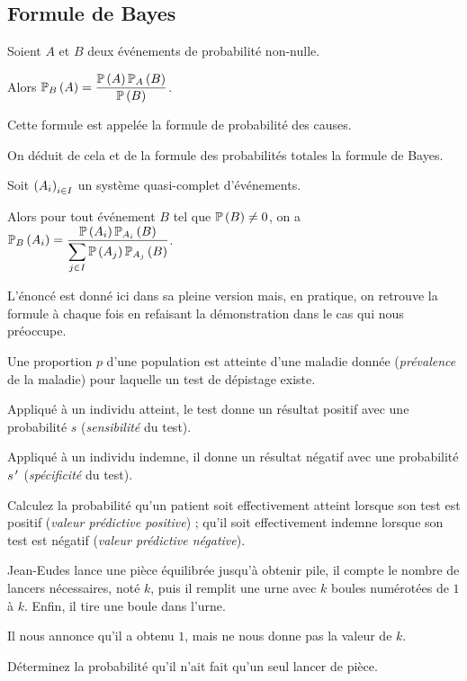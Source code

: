 \subsection{Formule de Bayes}

\begin{prop}
Soient \(A\) et \(B\) deux événements de probabilité non-nulle.

Alors \(\probacond{A}{B}=\dfrac{\proba{A}\probacond{B}{A}}{\proba{B}}\).
\end{prop}

Cette formule est appelée la formule de probabilité des causes.

On déduit de cela et de la formule des probabilités totales la formule de Bayes.

\begin{theo}
Soit \(\paren{A_i}_{i\in I}\) un système quasi-complet d'événements.

Alors pour tout événement \(B\) tel que \(\proba{B}\not=0\), on a \(\probacond{A_i}{B}=\dfrac{\proba{A_i}\probacond{B}{A_i}}{\ds\sum_{j\in I}\proba{A_j}\probacond{B}{A_j}}\).
\end{theo}

\begin{rem}
L'énoncé est donné ici dans sa pleine version mais, en pratique, on retrouve la formule à chaque fois en refaisant la démonstration dans le cas qui nous préoccupe.
\end{rem}

\begin{exo}
Une proportion \(p\) d'une population est atteinte d'une maladie donnée (\textit{prévalence} de la maladie) pour laquelle un test de dépistage existe.

Appliqué à un individu atteint, le test donne un résultat positif avec une probabilité \(s\) (\textit{sensibilité} du test).

Appliqué à un individu indemne, il donne un résultat négatif avec une probabilité \(s\prim\) (\textit{spécificité} du test).

Calculez la probabilité qu'un patient soit effectivement atteint lorsque son test est positif (\textit{valeur prédictive positive}) ; qu'il soit effectivement indemne lorsque son test est négatif (\textit{valeur prédictive négative}).
\end{exo}

\begin{exo}
Jean-Eudes lance une pièce équilibrée jusqu'à obtenir pile, il compte le nombre de lancers nécessaires, noté \(k\), puis il remplit une urne avec \(k\) boules numérotées de \(1\) à \(k\). Enfin, il tire une boule dans l'urne.

Il nous annonce qu'il a obtenu \(1\), mais ne nous donne pas la valeur de \(k\).

Déterminez la probabilité qu'il n'ait fait qu'un seul lancer de pièce.
\end{exo}

